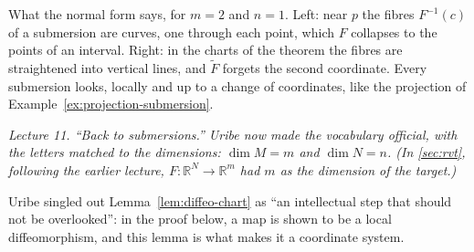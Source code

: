 \documentclass[11pt]{report}
\begin{document}
\begin{center}
\end{center}

What the normal form says, for $m = 2$ and $n = 1$. Left: near $p$ the fibres $F^{-1}(c)$ of a submersion are curves, one through each point, which $F$ collapses to the points of an interval. Right: in the charts of the theorem the fibres are straightened into vertical lines, and $\tilde F$ forgets the second coordinate. Every submersion looks, locally and up to a change of coordinates, like the projection of Example~\ref{ex:projection-submersion}.


\textit{Lecture 11. ``Back to submersions.'' Uribe now made the vocabulary official, with the letters matched to the dimensions: $\dim M = m$ and $\dim N = n$. (In \ref{sec:rvt}, following the earlier lecture, $F : \mathbb{R}^N \to \mathbb{R}^m$ had $m$ as the dimension of the target.)}


Uribe singled out Lemma~\ref{lem:diffeo-chart} as ``an intellectual step that should not be overlooked'': in the proof below, a map is shown to be a local diffeomorphism, and this lemma is what makes it a coordinate system.
\end{document}
